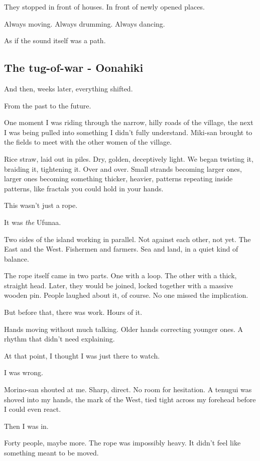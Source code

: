 \documentclass[
  letterpaper,
  oneside]{scrbook}
\begin{document}
They stopped in front of houses. In front of newly opened places.

Always moving. Always drumming. Always dancing.

As if the sound itself was a path.

\subsection{The tug-of-war - Oonahiki}\label{the-tug-of-war---oonahiki}

And then, weeks later, everything shifted.

From the past to the future.

One moment I was riding through the narrow, hilly roads of the village,
the next I was being pulled into something I didn't fully understand.
Miki-san brought to the fields to meet with the other women of the
village.

Rice straw, laid out in piles. Dry, golden, deceptively light. We began
twisting it, braiding it, tightening it. Over and over. Small strands
becoming larger ones, larger ones becoming something thicker, heavier,
patterns repeating inside patterns, like fractals you could hold in your
hands.

This wasn't just a rope.

It was \emph{the} Ufunaa.

Two sides of the island working in parallel. Not against each other, not
yet. The East and the West. Fishermen and farmers. Sea and land, in a
quiet kind of balance.

The rope itself came in two parts. One with a loop. The other with a
thick, straight head. Later, they would be joined, locked together with
a massive wooden pin. People laughed about it, of course. No one missed
the implication.

But before that, there was work. Hours of it.

Hands moving without much talking. Older hands correcting younger ones.
A rhythm that didn't need explaining.

At that point, I thought I was just there to watch.

I was wrong.

Morino-san shouted at me. Sharp, direct. No room for hesitation. A
tenugui was shoved into my hands, the mark of the West, tied tight
across my forehead before I could even react.

Then I was in.

Forty people, maybe more. The rope was impossibly heavy. It didn't feel
like something meant to be moved.
\end{document}
